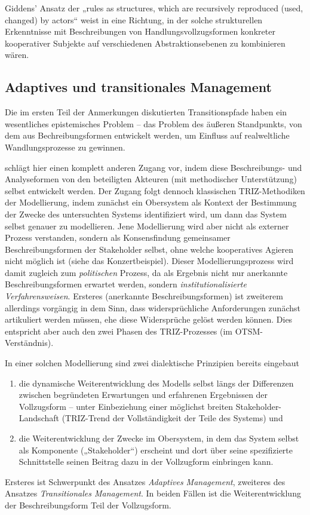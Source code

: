 \documentclass[11pt,a4paper]{article}
\begin{document}
Giddens' Ansatz der „rules as structures, which are recursively reproduced
(used, changed) by actors“ weist in eine Richtung, in der solche strukturellen
Erkenntnisse mit Beschreibungen von Handlungsvollzugsformen konkreter
kooperativer Subjekte auf verschiedenen Abstraktionsebenen zu kombinieren
wären.

\subsection{Adaptives und transitionales Management \cite{Foxon2009}}

Die im ersten Teil der Anmerkungen diskutierten Transitionspfade haben ein
wesentliches epistemisches Problem -- das Problem des äußeren Standpunkts, von
dem aus Bechreibungsformen entwickelt werden, um Einfluss auf realweltliche
Wandlungsprozesse zu gewinnen.

\cite{Foxon2009} schlägt hier einen komplett anderen Zugang vor, indem diese
Beschreibungs- und Analyseformen von den beteiligten Akteuren (mit
methodischer Unterstützung) selbst entwickelt werden. Der Zugang folgt dennoch
klassischen TRIZ-Methodiken der Modellierung, indem zunächst ein Obersystem
als Kontext der Bestimmung der Zwecke des untersuchten Systems identifiziert
wird, um dann das System selbst genauer zu modellieren. Jene Modellierung wird
aber nicht als externer Prozess verstanden, sondern als Konsensfindung
gemeinsamer Beschreibungsformen der Stakeholder selbst, ohne welche
kooperatives Agieren nicht möglich ist (siehe das Konzertbeispiel). Dieser
Modellierungsprozess wird damit zugleich zum \emph{politischen} Prozess, da
als Ergebnis nicht nur anerkannte Beschreibungsformen erwartet werden, sondern
\emph{institutionalisierte Verfahrensweisen}. Ersteres (anerkannte
Beschreibungsformen) ist zweiterem allerdings vorgängig in dem Sinn, dass
widersprüchliche Anforderungen zunächst artikuliert werden müssen, ehe diese
Widersprüche gelöst werden können. Dies entspricht aber auch den zwei Phasen
des TRIZ-Prozesses (im OTSM-Verständnis).

In einer solchen Modellierung sind zwei dialektische Prinzipien bereits
eingebaut
\begin{enumerate}[noitemsep]
\item die dynamische Weiterentwicklung des Modells selbst längs der
  Differenzen zwischen begründeten Erwartungen und erfahrenen Ergebnissen der
  Vollzugsform -- unter Einbeziehung einer möglichst breiten
  Stakeholder-Landschaft (TRIZ-Trend der Vollständigkeit der Teile des
  Systems) und
\item die Weiterentwicklung der Zwecke im Obersystem, in dem das System selbst
  als Komponente („Stakeholder“) erscheint und dort über seine spezifizierte
  Schnittstelle seinen Beitrag dazu in der Vollzugform einbringen kann.
\end{enumerate}
Ersteres ist Schwerpunkt des Ansatzes \emph{Adaptives Management}, zweiteres
des Ansatzes \emph{Transitionales Management}. In beiden Fällen ist die
Weiterentwicklung der Beschreibungsform Teil der Vollzugsform.
\end{document}
